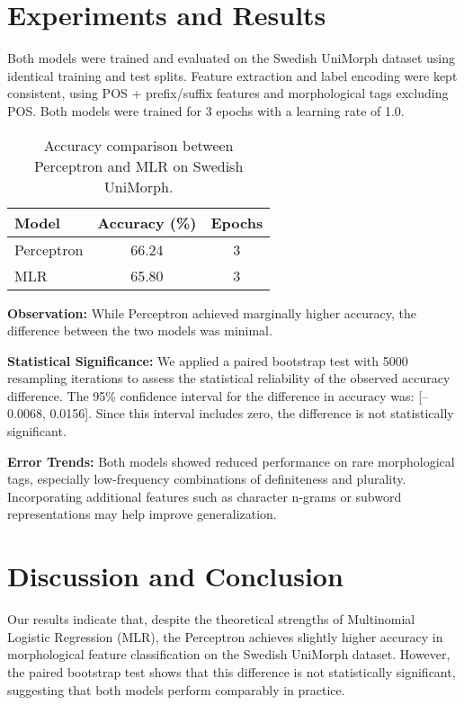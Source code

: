\documentclass[11pt]{article}
\begin{document}
\section{Experiments and Results}
Both models were trained and evaluated on the Swedish UniMorph dataset using identical training and test splits. Feature extraction and label encoding were kept consistent, using POS + prefix/suffix features and morphological tags excluding POS. Both models were trained for 3 epochs with a learning rate of 1.0.

\begin{table}[h]
\centering
\begin{tabular}{lcc}
\hline
\textbf{Model} & \textbf{Accuracy (\%)} & \textbf{Epochs} \\
\hline
Perceptron & 66.24 & 3 \\
MLR        & 65.80 & 3 \\
\hline
\end{tabular}
\caption{Accuracy comparison between Perceptron and MLR on Swedish UniMorph.}
\end{table}

\textbf{Observation:} While Perceptron achieved marginally higher accuracy, the difference between the two models was minimal.

\textbf{Statistical Significance:} We applied a paired bootstrap test with 5000 resampling iterations to assess the statistical reliability of the observed accuracy difference. The 95\% confidence interval for the difference in accuracy was: [--0.0068, 0.0156]. Since this interval includes zero, the difference is not statistically significant.

\textbf{Error Trends:} Both models showed reduced performance on rare morphological tags, especially low-frequency combinations of definiteness and plurality. Incorporating additional features such as character n-grams or subword representations may help improve generalization.

\section{Discussion and Conclusion}
Our results indicate that, despite the theoretical strengths of Multinomial Logistic Regression (MLR), the Perceptron achieves slightly higher accuracy in morphological feature classification on the Swedish UniMorph dataset. However, the paired bootstrap test shows that this difference is not statistically significant, suggesting that both models perform comparably in practice.
\end{document}
